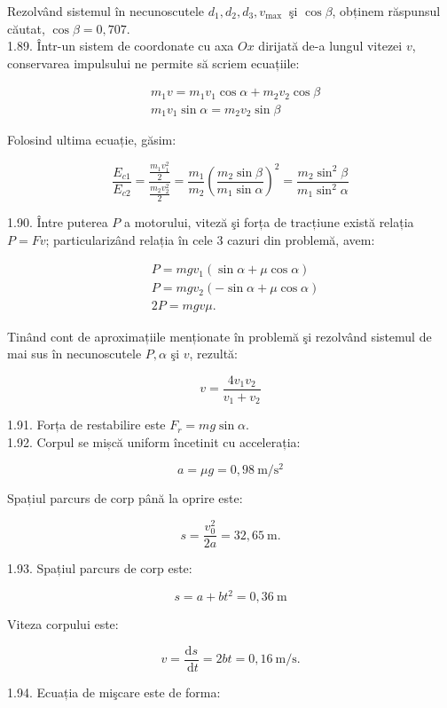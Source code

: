 \documentclass[10pt]{article}
\begin{document}
Rezolvând sistemul în necunoscutele $d_{1}, d_{2}, d_{3}, v_{\text {max }}$ şi $\cos \beta$, obținem răspunsul căutat, $\cos \beta=0,707$.\\
1.89. Într-un sistem de coordonate cu axa $O x$ dirijată de-a lungul vitezei $v$, conservarea impulsului ne permite să scriem ecuațiile:

$$
\begin{aligned}
& m_{1} v=m_{1} v_{1} \cos \alpha+m_{2} v_{2} \cos \beta \\
& m_{1} v_{1} \sin \alpha=m_{2} v_{2} \sin \beta
\end{aligned}
$$

Folosind ultima ecuație, găsim:

$$
\frac{E_{c 1}}{E_{c 2}}=\frac{\frac{m_{1} v_{1}^{2}}{2}}{\frac{m_{2} v_{2}^{2}}{2}}=\frac{m_{1}}{m_{2}}\left(\frac{m_{2} \sin \beta}{m_{1} \sin \alpha}\right)^{2}=\frac{m_{2} \sin ^{2} \beta}{m_{1} \sin ^{2} \alpha}
$$

1.90. Între puterea $P$ a motorului, viteză şi forța de tracțiune există relația $P=F v$; particularizând relația în cele 3 cazuri din problemă, avem:

$$
\begin{aligned}
& P=m g v_{1}(\sin \alpha+\mu \cos \alpha) \\
& P=m g v_{2}(-\sin \alpha+\mu \cos \alpha) \\
& 2 P=m g v \mu .
\end{aligned}
$$

Tinând cont de aproximațiile menționate în problemă şi rezolvând sistemul de mai sus în necunoscutele $P, \alpha$ şi $v$, rezultă:

$$
v=\frac{4 v_{1} v_{2}}{v_{1}+v_{2}}
$$

1.91. Forța de restabilire este $F_{r}=m g \sin \alpha$.\\
1.92. Corpul se mișcă uniform încetinit cu accelerația:

$$
a=\mu g=0,98 \mathrm{~m} / \mathrm{s}^{2}
$$

Spațiul parcurs de corp până la oprire este:

$$
s=\frac{v_{0}^{2}}{2 a}=32,65 \mathrm{~m} .
$$

1.93. Spațiul parcurs de corp este:

$$
s=a+b t^{2}=0,36 \mathrm{~m}
$$

Viteza corpului este:

$$
v=\frac{\mathrm{d} s}{\mathrm{~d} t}=2 b t=0,16 \mathrm{~m} / \mathrm{s} .
$$

1.94. Ecuația de mişcare este de forma:
\end{document}
